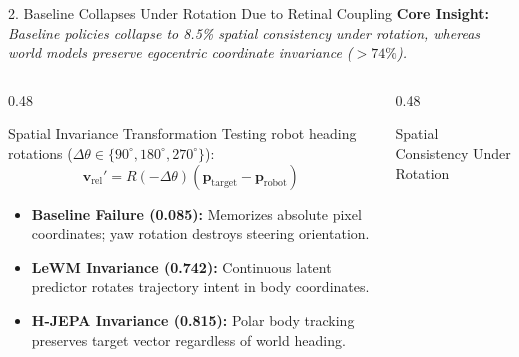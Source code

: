\documentclass[aspectratio=169, 10pt]{beamer}
\begin{document}
\begin{frame}{2. Baseline Collapses Under Rotation Due to Retinal Coupling}
  \textbf{Core Insight:} \textit{Baseline policies collapse to 8.5\% spatial consistency under rotation, whereas world models preserve egocentric coordinate invariance ($>74\%$).}

  \vspace{0.2cm}
  \begin{columns}[T]
    \begin{column}{0.48\textwidth}
      \begin{block}{Spatial Invariance Transformation}
        \small
        Testing robot heading rotations ($\Delta \theta \in \{90^\circ, 180^\circ, 270^\circ\}$):
        \begin{equation*}
          \mathbf{v}_{\mathrm{rel}}' = R(-\Delta \theta) (\mathbf{p}_{\mathrm{target}} - \mathbf{p}_{\mathrm{robot}})
        \end{equation*}
        \begin{itemize}
          \item \textbf{Baseline Failure (\alert{0.085}):} Memorizes absolute pixel coordinates; yaw rotation destroys steering orientation.
          \item \textbf{LeWM Invariance (\textbf{0.742}):} Continuous latent predictor rotates trajectory intent in body coordinates.
          \item \textbf{H-JEPA Invariance (\textbf{0.815}):} Polar body tracking preserves target vector regardless of world heading.
        \end{itemize}
      \end{block}
    \end{column}

    \begin{column}{0.48\textwidth}
      \begin{block}{Spatial Consistency Under Rotation}
        \centering
\end{block}
\end{column}
\end{columns}
\end{frame}
\end{document}

